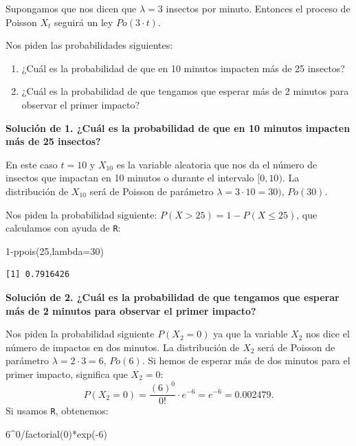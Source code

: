 \documentclass[
  letterpaper,
  DIV=11,
  numbers=noendperiod]{scrreprt}
\newenvironment{Shaded}{\begin{snugshade}}{\end{snugshade}}
\newcommand{\AttributeTok}[1]{\textcolor[rgb]{0.40,0.45,0.13}{#1}}
\newcommand{\DecValTok}[1]{\textcolor[rgb]{0.68,0.00,0.00}{#1}}
\newcommand{\FunctionTok}[1]{\textcolor[rgb]{0.28,0.35,0.67}{#1}}
\newcommand{\NormalTok}[1]{\textcolor[rgb]{0.00,0.23,0.31}{#1}}
\newcommand{\SpecialCharTok}[1]{\textcolor[rgb]{0.37,0.37,0.37}{#1}}
\providecommand{\tightlist}{%
  \setlength{\itemsep}{0pt}\setlength{\parskip}{0pt}}\usepackage{longtable,booktabs,array}
\begin{document}
Supongamos que nos dicen que \(\lambda=3\) insectos por minuto. Entonces
el proceso de Poisson \(X_t\) seguirá un ley \(Po(3\cdot t).\)

Nos piden las probabilidades siguientes:

\begin{enumerate}
\def\labelenumi{\arabic{enumi}.}
\tightlist
\item
  ¿Cuál es la probabilidad de que en 10 minutos impacten más de 25
  insectos?
\item
  ¿Cuál es la probabilidad de que tengamos que esperar más de 2 minutos
  para observar el primer impacto?
\end{enumerate}

\textbf{Solución de 1. ¿Cuál es la probabilidad de que en 10 minutos
impacten más de 25 insectos?}

En este caso \(t=10\) y \(X_{10}\) es la variable aleatoria que nos da
el número de insectos que impactan en 10 minutos o durante el intervalo
\([0,10)\). La distribución de \(X_{10}\) será de Poisson de parámetro
\(\lambda=3\cdot 10=30)\), \(Po(30)\).

Nos piden la probabilidad siguiente: \(P(X>25)=1-P(X\leq 25)\), que
calculamos con ayuda de \texttt{R}:

\begin{Shaded}
\begin{Highlighting}[]
\DecValTok{1}\SpecialCharTok{{-}}\FunctionTok{ppois}\NormalTok{(}\DecValTok{25}\NormalTok{,}\AttributeTok{lambda=}\DecValTok{30}\NormalTok{)}
\end{Highlighting}
\end{Shaded}

\begin{verbatim}
[1] 0.7916426
\end{verbatim}

\textbf{Solución de 2. ¿Cuál es la probabilidad de que tengamos que
esperar más de 2 minutos para observar el primer impacto?}

Nos piden la probabilidad siguiente \(P(X_2=0)\) ya que la variable
\(X_2\) nos dice el número de impactos en dos minutos. La distribución
de \(X_2\) será de Poisson de parámetro \(\lambda =2\cdot 3=6\),
\(Po(6)\). Si hemos de esperar más de dos minutos para el primer
impacto, significa que \(X_2=0\):
\[P(X_2=0)=\frac{(6)^0}{0!}\cdot e^{-6}= e^{-6}=0.002479.\] Si usamos
\texttt{R}, obtenemos:

\begin{Shaded}
\begin{Highlighting}[]
\DecValTok{6}\SpecialCharTok{\^{}}\DecValTok{0}\SpecialCharTok{/}\FunctionTok{factorial}\NormalTok{(}\DecValTok{0}\NormalTok{)}\SpecialCharTok{*}\FunctionTok{exp}\NormalTok{(}\SpecialCharTok{{-}}\DecValTok{6}\NormalTok{)}
\end{Highlighting}
\end{Shaded}
\end{document}
